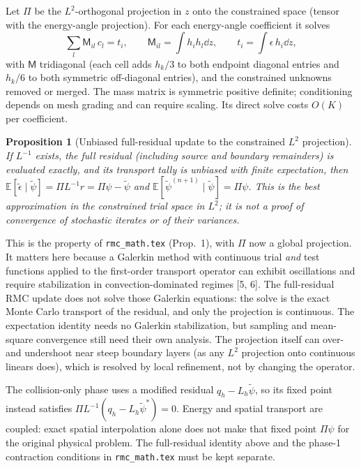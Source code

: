 \documentclass[11pt]{article}
\newtheorem{proposition}{Proposition}
\newcommand{\tpsi}{\tilde\psi}
\newcommand{\teps}{\tilde\epsilon}
\newcommand{\E}{\mathbb{E}}
\begin{document}
Let $\Pi$ be the $L^2$-orthogonal projection in $z$ onto the constrained space (tensor
with the energy-angle projection). For each energy-angle coefficient it solves
\begin{equation}
  \sum_l \mathsf M_{il}\,c_l = t_i,\qquad
  \mathsf M_{il} = \int h_ih_l\dd z,\qquad t_i = \int \epsilon\,h_i\dd z,
  \label{eq:mass}
\end{equation}
with $\mathsf M$ tridiagonal (each cell adds $h_k/3$ to both endpoint diagonal
entries and $h_k/6$ to both symmetric off-diagonal entries), and the constrained
unknowns removed or merged. The mass matrix is symmetric positive definite;
conditioning depends on mesh grading and can require scaling. Its direct solve costs
$O(K)$ per coefficient.

\begin{proposition}[Unbiased full-residual update to the constrained $L^2$ projection]
If $L^{-1}$ exists, the full residual (including source and boundary remainders) is
evaluated exactly, and its transport tally is unbiased with finite expectation, then
$\E[\teps\mid\tpsi]=\Pi L^{-1}r=\Pi\psi-\tpsi$ and
$\E[\tpsi^{(n+1)}\mid\tpsi]=\Pi\psi$. This is the best approximation in the
constrained trial space in $L^2$; it is not a proof of convergence of stochastic
iterates or of their variances.
\end{proposition}

\noindent This is the property of \texttt{rmc\_math.tex} (Prop.~1), with $\Pi$ now a
global projection. It matters here because a Galerkin method with continuous trial
\emph{and} test functions applied to the first-order transport operator can exhibit
oscillations and require stabilization in convection-dominated regimes [5, 6].
The full-residual RMC update does not solve those Galerkin
equations: the solve is the exact Monte Carlo transport of the residual, and only the
projection is continuous. The expectation identity needs no Galerkin stabilization,
but sampling and mean-square convergence still need their own analysis. The projection itself can
over- and undershoot near steep boundary layers (as any $L^2$ projection onto
continuous linears does), which is resolved by local refinement, not by changing the
operator.

The collision-only phase uses a modified residual $q_h-L_h\tpsi$, so its fixed
point instead satisfies $\Pi L^{-1}(q_h-L_h\tpsi^*)=0$. Energy and spatial
transport are coupled: exact spatial interpolation alone does not make that fixed
point $\Pi\psi$ for the original physical problem. The full-residual identity
above and the phase-1 contraction conditions in \texttt{rmc\_math.tex} must be
kept separate.
\end{document}
